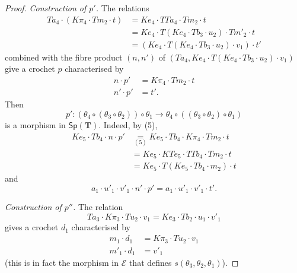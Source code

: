 \documentclass[fleqn]{article}
\newcommand{\oldpage}[1]{\marginpar{\footnotesize$\Big\vert$ \textit{p.~#1}}}
\newcommand{\TT}{\mathbf{T}}
\newcommand{\cat}[1]{\mathcal{#1}}
\newcommand{\Cat}[1]{\mathsf{#1}}
\newcommand{\Sp}[1]{\Cat{Sp}(#1)}
\begin{document}
\begin{proof}
  \medskip

  \emph{Construction of $p'$.}
  The relations
  \[
    \begin{aligned}
      Ta_4\cdot (K\pi_4\cdot Tm_2\cdot t)
      &= Ke_4\cdot TTa_4\cdot Tm_2\cdot t
    \\&=Ke_4\cdot T(Ke_4\cdot Tb_3\cdot u_2)\cdot Tm'_2\cdot t
    \\&= (Ke_4\cdot T(Ke_4\cdot Tb_3\cdot u_2)\cdot v_1)\cdot t'
    \end{aligned}
  \]
  combined with the fibre product $(n,n')$ of $(Ta_4,Ke_4\cdot T(Ke_4\cdot Tb_3\cdot u_2)\cdot v_1)$ give a crochet $p$ characterised by
  \[
    \begin{aligned}
      n\cdot p'
      &= K\pi_4\cdot Tm_2\cdot t
    \\n'\cdot p'
      &= t'.
    \end{aligned}
    \tag{5}
  \]
  Then
  \[
    p'\colon(\theta_4\circ(\theta_3\circ\theta_2))\circ\theta_1
    \to \theta_4\circ((\theta_3\circ\theta_2)\circ\theta_1)
  \]
  is a morphism in $\Sp{\TT}$.
  Indeed, by (5),
  \[
    \begin{aligned}
      Ke_5\cdot Tb_4\cdot n\cdot p'
      &\underset{(5)}{=} Ke_5\cdot Tb_4\cdot K\pi_4\cdot Tm_2\cdot t
    \\&= Ke_5\cdot KTe_5\cdot TTb_4\cdot Tm_2\cdot t
    \\&= Ke_5\cdot T(Ke_5\cdot Tb_4\cdot m_2)\cdot t
    \end{aligned}
  \]
  and
  \[
    a_1\cdot u'_1\cdot v'_1\cdot n'\cdot p'
    = a_1\cdot u'_1\cdot v'_1\cdot t'.
  \]

  \medskip

  \emph{Construction of $p''$.}
  The relation
  \[
    Ta_3\cdot K\pi_3\cdot Tu_2\cdot v_1
    = Ke_3\cdot Tb_2\cdot u_1\cdot v'_1
  \]
  gives a crochet $d_1$ characterised by
  \[
    \begin{aligned}
      m_1\cdot d_1
      &= K\pi_3\cdot Tu_2\cdot v_1
    \\m'_1\cdot d_1
      &= v'_1
    \end{aligned}
    \tag{6}
  \]
  \oldpage{255}
  (this is in fact the morphism in $\cat{E}$ that defines $s(\theta_3,\theta_2,\theta_1)$).


\end{proof}
\end{document}
